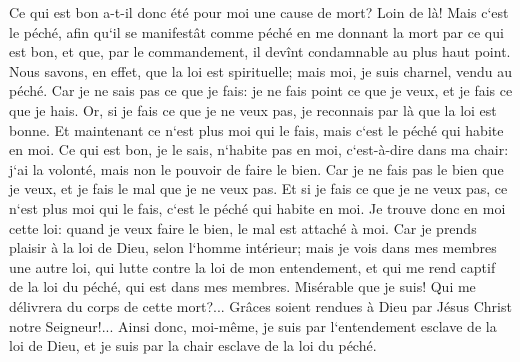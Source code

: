 \verse Ce qui est bon a-t-il donc été pour moi une cause de mort? Loin de là! Mais c`est le péché, afin qu`il se manifestât comme péché en me donnant la mort par ce qui est bon, et que, par le commandement, il devînt condamnable au plus haut point. 
\verse Nous savons, en effet, que la loi est spirituelle; mais moi, je suis charnel, vendu au péché. 
\verse Car je ne sais pas ce que je fais: je ne fais point ce que je veux, et je fais ce que je hais. 
\verse Or, si je fais ce que je ne veux pas, je reconnais par là que la loi est bonne. 
\verse Et maintenant ce n`est plus moi qui le fais, mais c`est le péché qui habite en moi. 
\verse Ce qui est bon, je le sais, n`habite pas en moi, c`est-à-dire dans ma chair: j`ai la volonté, mais non le pouvoir de faire le bien. 
\verse Car je ne fais pas le bien que je veux, et je fais le mal que je ne veux pas. 
\verse Et si je fais ce que je ne veux pas, ce n`est plus moi qui le fais, c`est le péché qui habite en moi. 
\verse Je trouve donc en moi cette loi: quand je veux faire le bien, le mal est attaché à moi. 
\verse Car je prends plaisir à la loi de Dieu, selon l`homme intérieur; 
\verse mais je vois dans mes membres une autre loi, qui lutte contre la loi de mon entendement, et qui me rend captif de la loi du péché, qui est dans mes membres. 
\verse Misérable que je suis! Qui me délivrera du corps de cette mort?... 
\verse Grâces soient rendues à Dieu par Jésus Christ notre Seigneur!... Ainsi donc, moi-même, je suis par l`entendement esclave de la loi de Dieu, et je suis par la chair esclave de la loi du péché. 


